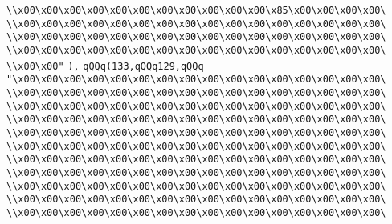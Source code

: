 \verb|\\x00\x00\x00\x00\x00\x00\x00\x00\x00\x00\x00\x85\x00\x00\x00\x00\|\newline
\verb|\\x00\x00\x00\x00\x00\x00\x00\x00\x00\x00\x00\x00\x00\x00\x00\x00\|\newline
\verb|\\x00\x00\x00\x00\x00\x00\x00\x00\x00\x00\x00\x00\x00\x00\x00\x00\|\newline
\verb|\\x00\x00\x00\x00\x00\x00\x00\x00\x00\x00\x00\x00\x00\x00\x00\x00\|\newline
\verb|\\x00\x00"|\newline
\verb|),|\newline
\verb|qQQq(133,qQQq129,qQQq|\newline
\verb|"\x00\x00\x00\x00\x00\x00\x00\x00\x00\x00\x00\x00\x00\x00\x00\x00\|\newline
\verb|\\x00\x00\x00\x00\x00\x00\x00\x00\x00\x00\x00\x00\x00\x00\x00\x00\|\newline
\verb|\\x00\x00\x00\x00\x00\x00\x00\x00\x00\x00\x00\x00\x00\x00\x00\x00\|\newline
\verb|\\x00\x00\x00\x00\x00\x00\x00\x00\x00\x00\x00\x00\x00\x00\x00\x00\|\newline
\verb|\\x00\x00\x00\x00\x00\x00\x00\x00\x00\x00\x00\x00\x00\x00\x00\x00\|\newline
\verb|\\x00\x00\x00\x00\x00\x00\x00\x00\x00\x00\x00\x00\x00\x00\x00\x00\|\newline
\verb|\\x00\x00\x00\x00\x00\x00\x00\x00\x00\x00\x00\x00\x00\x00\x00\x00\|\newline
\verb|\\x00\x00\x00\x00\x00\x00\x00\x00\x00\x00\x00\x00\x00\x00\x00\x00\|\newline
\verb|\\x00\x00\x00\x00\x00\x00\x00\x00\x00\x00\x00\x00\x00\x00\x00\x00\|\newline
\verb|\\x00\x00\x00\x00\x00\x00\x00\x00\x00\x00\x00\x00\x00\x00\x00\x00\|\newline
\verb|\\x00\x00\x00\x00\x00\x00\x00\x00\x00\x00\x00\x00\x00\x00\x00\x00\|\newline
